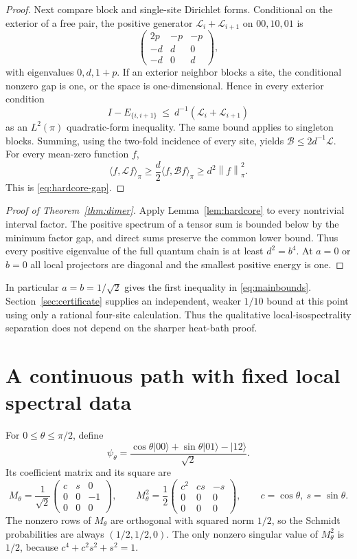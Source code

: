 \documentclass[11pt,a4paper]{article}
\theoremstyle{remark}\newtheorem{remark}[theorem]{Remark}
\newcommand{\ket}[1]{\lvert #1\rangle}
\newcommand{\norm}[1]{\left\lVert #1\right\rVert}
\begin{document}
\begin{proof}
Next compare block and single-site Dirichlet forms. Conditional on the exterior of a free pair, the positive generator $\mathcal L_i+\mathcal L_{i+1}$ on $00,10,01$ is
\[
 \begin{pmatrix}2p&-p&-p\\-d&d&0\\-d&0&d\end{pmatrix},
\]
with eigenvalues $0,d,1+p$. If an exterior neighbor blocks a site, the conditional nonzero gap is one, or the space is one-dimensional. Hence in every exterior condition
\[
 I-E_{\{i,i+1\}}\ \le\ d^{-1}(\mathcal L_i+\mathcal L_{i+1})
\]
as an $L^2(\pi)$ quadratic-form inequality. The same bound applies to singleton blocks. Summing, using the two-fold incidence of every site, yields
$\mathcal B\le2d^{-1}\mathcal L$. For every mean-zero function $f$,
\[
 \langle f,\mathcal Lf\rangle_\pi
 \ge\frac d2\langle f,\mathcal Bf\rangle_\pi
 \ge d^2\norm f_\pi^2.
\]
This is \eqref{eq:hardcore-gap}.
\end{proof}
\begin{proof}[Proof of Theorem~\ref{thm:dimer}]
Apply Lemma~\ref{lem:hardcore} to every nontrivial interval factor. The positive spectrum of a tensor sum is bounded below by the minimum factor gap, and direct sums preserve the common lower bound. Thus every positive eigenvalue of the full quantum chain is at least $d^2=b^4$. At $a=0$ or $b=0$ all local projectors are diagonal and the smallest positive energy is one.
\end{proof}
In particular $a=b=1/\sqrt2$ gives the first inequality in \eqref{eq:mainbounds}. Section~\ref{sec:certificate} supplies an independent, weaker $1/10$ bound at this point using only a rational four-site calculation. Thus the qualitative local-isospectrality separation does not depend on the sharper heat-bath proof.

\section{A continuous path with fixed local spectral data}\label{sec:isospectral}
For $0\le\theta\le\pi/2$, define
\begin{equation}\label{eq:isopath}
 \psi_\theta=\frac{\cos\theta\ket{00}+\sin\theta\ket{01}-\ket{12}}{\sqrt2}.
\end{equation}
Its coefficient matrix and its square are
\[
 M_\theta=\frac1{\sqrt2}
 \begin{pmatrix}c&s&0\\0&0&-1\\0&0&0\end{pmatrix},\qquad
 M_\theta^2=\frac12
 \begin{pmatrix}c^2&cs&-s\\0&0&0\\0&0&0\end{pmatrix},
 \qquad c=\cos\theta,\ s=\sin\theta.
\]
The nonzero rows of $M_\theta$ are orthogonal with squared norm $1/2$, so the Schmidt probabilities are always $(1/2,1/2,0)$. The only nonzero singular value of $M_\theta^2$ is $1/2$, because $c^4+c^2s^2+s^2=1$.
\end{document}
